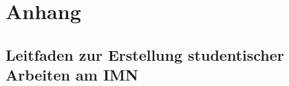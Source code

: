 \documentclass[12pt,
titlepage,
a4paper,
oneside,     %
openany,     %
listof=totoc,  %
numbers = noenddot, %
bibliography=totoc,    %
headsepline, %
]{scrbook} %
\begin{document}
\printbibliography

\label{letzteSeite}
\appendix

\chapter{Anhang}
\label{cha_ausb}

\section{Leitfaden zur Erstellung studentischer Arbeiten am IMN}
\label{sec_Leitfaden}

\end{document}
